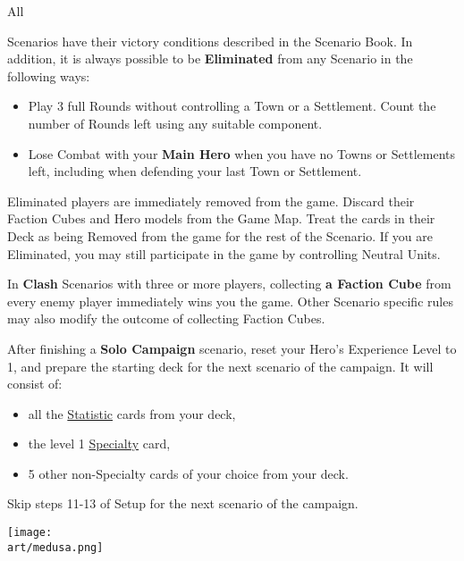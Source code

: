
\begin{multicols*}{2}

\hypertarget{End}{All} Scenarios have their victory conditions described in the Scenario Book.
In addition, it is always possible to be \textbf{Eliminated} from any Scenario in the following ways:
\begin{itemize}
  \item Play 3 full Rounds without controlling a Town or a Settlement.
    Count the number of Rounds left using any suitable component.
  \item Lose Combat with your \textbf{Main Hero} when you have no Towns or Settlements left, including when defending your last Town or Settlement.
\end{itemize}
Eliminated players are immediately removed from the game.
Discard their Faction Cubes and Hero models from the Game Map.
Treat the cards in their Deck as being Removed from the game for the rest of the Scenario.
If you are Eliminated, you may still participate in the game by controlling Neutral Units.\par
{}\par

In \textbf{Clash} Scenarios with three or more players, collecting \textbf{a Faction Cube} from every enemy player immediately wins you the game.
Other Scenario specific rules may also modify the outcome of collecting Faction Cubes.

\columnbreak

After finishing a \textbf{Solo Campaign} scenario, reset your Hero's Experience Level to 1, and prepare the starting deck for the next scenario of the campaign.
It will consist of:
\begin{itemize}
  \item all the \hyperlink{Statistic}{Statistic} cards from your deck,
  \item the level 1 \hyperlink{Specialty}{Specialty} card,
  \item 5 other non-Specialty cards of your choice from your deck.
\end{itemize}
Skip steps 11-13 of Setup for the next scenario of the campaign.

\vspace*{\fill}
\hspace{-4em}
\texttt{[image: \\art/medusa.png]}

\end{multicols*}
